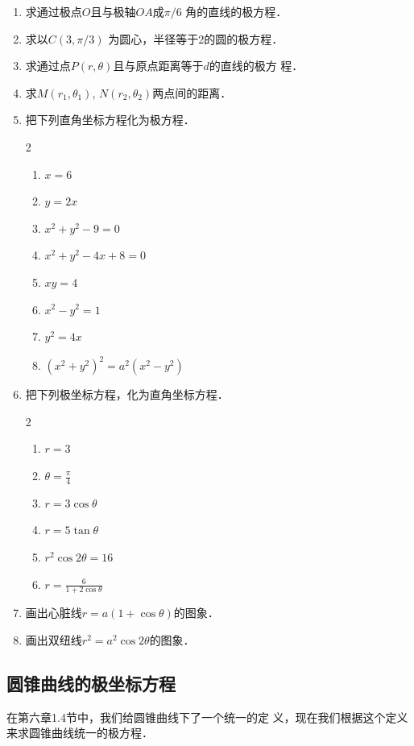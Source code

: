 \begin{ex}
\begin{enumerate}
    \item 求通过极点$O$且与极轴$OA$成$\pi/6$
    角的直线的极方程．
    \item 求以$C(3,\pi/3)$
    为圆心，半径等于2的圆的极方程．
    \item 求通过点$P(r,\theta )$且与原点距离等于$d$的直线的极方
    程．
    \item 求$M(r_1,\theta_1)$, $N(r_2,\theta_2)$两点间的距离．
    \item 把下列直角坐标方程化为极方程．
\begin{multicols}{2}
\begin{enumerate}
\item $x=6$
\item $y=2x$
\item $x^2+y^2-9=0$
\item $x^2+y^2-4x+8=0$
\item $xy=4$
\item $x^2-y^2=1$
\item $y^2=4x$
\item $(x^2+y^2)^2=a^2(x^2-y^2)$
\end{enumerate}
\end{multicols}

    \item 把下列极坐标方程，化为直角坐标方程．
\begin{multicols}{2}
\begin{enumerate}
\item $r=3$
\item $\theta=\frac{\pi}{4}$
\item $r=3\cos\theta$
\item $r=5\tan\theta$
\item $r^2\cos 2\theta=16$
\item $r=\frac{6}{1+2\cos\theta}$
\end{enumerate}
\end{multicols}
    \item 画出心脏线$r=a(1+\cos\theta )$的图象．
    \item 画出双纽线$r^2=a^2\cos2\theta$的图象．
\end{enumerate}
\end{ex}

\subsection{圆锥曲线的极坐标方程}
在第六章1.4节中，我们给圆锥曲线下了一个统一的定
义，现在我们根据这个定义来求圆锥曲线统一的极方程．

